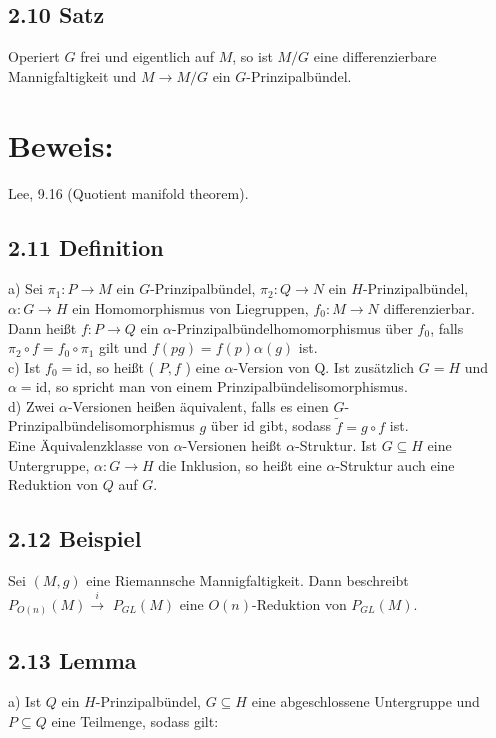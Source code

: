 \documentclass[10pt, letterpaper]{article}
\begin{document}
\subsection*{2.10 Satz}
Operiert $G$ frei und eigentlich auf $M$, so ist $M / G$ eine differenzierbare Mannigfaltigkeit und $M \rightarrow M / G$ ein $G$-Prinzipalbündel.

\section*{Beweis:}
Lee, 9.16 (Quotient manifold theorem).

\subsection*{2.11 Definition}
a) Sei $\pi_{1}: P \rightarrow M$ ein $G$-Prinzipalbündel, $\pi_{2}: Q \rightarrow N$ ein $H$-Prinzipalbündel, $\alpha: G \rightarrow H$ ein Homomorphismus von Liegruppen, $f_{0}: M \rightarrow N$ differenzierbar. Dann heißt $f: P \rightarrow Q$ ein $\alpha$-Prinzipalbündelhomomorphismus über $f_{0}$, falls $\pi_{2} \circ f=f_{0} \circ \pi_{1}$ gilt und $f(p g)=f(p) \alpha(g)$ ist.\\
c) Ist $f_{0}=\mathrm{id}$, so heißt ( $P, f$ ) eine $\alpha$-Version von Q. Ist zusätzlich $G=H$ und $\alpha=\mathrm{id}$, so spricht man von einem Prinzipalbündelisomorphismus.\\
d) Zwei $\alpha$-Versionen heißen äquivalent, falls es einen $G$-Prinzipalbündelisomorphismus $g$ über id gibt, sodass $\tilde{f}=g \circ f$ ist.\\
Eine Äquivalenzklasse von $\alpha$-Versionen heißt $\alpha$-Struktur. Ist $G \subseteq H$ eine Untergruppe, $\alpha: G \rightarrow H$ die Inklusion, so heißt eine $\alpha$-Struktur auch eine Reduktion von $Q$ auf $G$.

\subsection*{2.12 Beispiel}
Sei $(M, g)$ eine Riemannsche Mannigfaltigkeit. Dann beschreibt $P_{O(n)}(M) \xrightarrow{i}$ $P_{G L}(M)$ eine $O(n)$-Reduktion von $P_{G L}(M)$.

\subsection*{2.13 Lemma}
a) Ist $Q$ ein $H$-Prinzipalbündel, $G \subseteq H$ eine abgeschlossene Untergruppe und $P \subseteq Q$ eine Teilmenge, sodass gilt:
\end{document}
